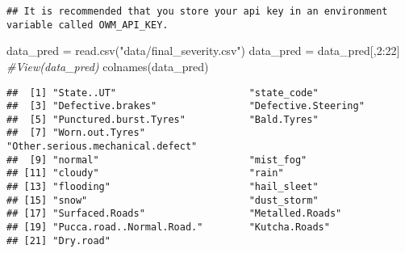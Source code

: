 \documentclass[
]{article}
\newenvironment{Shaded}{\begin{snugshade}}{\end{snugshade}}
\newcommand{\CommentTok}[1]{\textcolor[rgb]{0.56,0.35,0.01}{\textit{#1}}}
\newcommand{\DecValTok}[1]{\textcolor[rgb]{0.00,0.00,0.81}{#1}}
\newcommand{\FunctionTok}[1]{\textcolor[rgb]{0.00,0.00,0.00}{#1}}
\newcommand{\NormalTok}[1]{#1}
\newcommand{\OtherTok}[1]{\textcolor[rgb]{0.56,0.35,0.01}{#1}}
\newcommand{\SpecialCharTok}[1]{\textcolor[rgb]{0.00,0.00,0.00}{#1}}
\newcommand{\StringTok}[1]{\textcolor[rgb]{0.31,0.60,0.02}{#1}}
\begin{document}
\begin{verbatim}
## It is recommended that you store your api key in an environment variable called OWM_API_KEY.
\end{verbatim}

\begin{Shaded}
\begin{Highlighting}[]
\NormalTok{data\_pred }\OtherTok{=} \FunctionTok{read.csv}\NormalTok{(}\StringTok{"data/final\_severity.csv"}\NormalTok{)}
\NormalTok{data\_pred }\OtherTok{=}\NormalTok{ data\_pred[,}\DecValTok{2}\SpecialCharTok{:}\DecValTok{22}\NormalTok{]}
\CommentTok{\#View(data\_pred)}
\FunctionTok{colnames}\NormalTok{(data\_pred)}
\end{Highlighting}
\end{Shaded}

\begin{verbatim}
##  [1] "State..UT"                       "state_code"                     
##  [3] "Defective.brakes"                "Defective.Steering"             
##  [5] "Punctured.burst.Tyres"           "Bald.Tyres"                     
##  [7] "Worn.out.Tyres"                  "Other.serious.mechanical.defect"
##  [9] "normal"                          "mist_fog"                       
## [11] "cloudy"                          "rain"                           
## [13] "flooding"                        "hail_sleet"                     
## [15] "snow"                            "dust_storm"                     
## [17] "Surfaced.Roads"                  "Metalled.Roads"                 
## [19] "Pucca.road..Normal.Road."        "Kutcha.Roads"                   
## [21] "Dry.road"
\end{verbatim}
\end{document}
